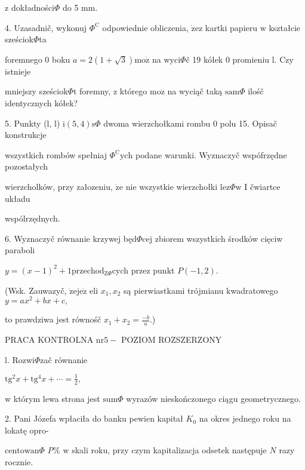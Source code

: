 \documentclass[a4paper,12pt]{article}
\begin{document}
$\mathrm{z}$ dokładności$\Phi$ do 5 mm.

4. Uzasadnič, wykonuj $\Phi^{\mathrm{C}}$ odpowiednie obliczenia, $\dot{\mathrm{z}}\mathrm{e}\mathrm{z}$ kartki papieru $\mathrm{w}$ kształcie sześciok$\Phi$ta

foremnego $0$ boku $a= 2(1+\sqrt{3}) \mathrm{m}\mathrm{o}\dot{\mathrm{z}}$ na wyci$\Phi$č 19 kółek $0$ promieniu l. Czy istnieje

mniejszy sześciok$\Phi$t foremny, $\mathrm{z}$ którego $\mathrm{m}\mathrm{o}\dot{\mathrm{z}}$ na wyciąč taką $\mathrm{s}\mathrm{a}\mathrm{m}\Phi$ ilośč identycznych kółek?

5. Punkty (l, l) $\mathrm{i} (5,4) \mathrm{s}\Phi$ dwoma wierzchołkami rombu $0$ polu 15. Opisač konstrukcje

wszystkich rombów spełniaj $\Phi^{\mathrm{C}}\mathrm{y}\mathrm{c}\mathrm{h}$ podane warunki. Wyznaczyč wspófrzędne pozostałych

wierzcholków, przy załozeniu, $\dot{\mathrm{z}}\mathrm{e}$ nie wszystkie wierzchołki $\mathrm{l}\mathrm{e}\mathrm{z}\Phi \mathrm{w}$ I čwiartce układu

wspólrzędnych.

6. Wyznaczyč równanie krzywej będ$\Phi$cej zbiorem wszystkich środków cięciw paraboli

$y=(x-1)^{2}+1 \mathrm{p}\mathrm{r}\mathrm{z}\mathrm{e}\mathrm{c}\mathrm{h}\mathrm{o}\mathrm{d}_{\mathrm{Z}\Phi}$cych przez punkt $P(-1,2).$

(Wsk. Zauwazyč, $\dot{\mathrm{z}}\mathrm{e}\mathrm{j}\mathrm{e}\dot{\mathrm{z}}$ eli $x_{1}, x_{2}$ są pierwiastkami trójmianu kwadratowego $y=ax^{2}+bx+c,$

to prawdziwa jest równośč $x_{1}+x_{2}=\displaystyle \frac{-b}{a}.$)





PRACA KONTROLNA $\mathrm{n}\mathrm{r} 5-$ POZIOM ROZSZERZONY

l. Rozwi$\Phi$zač równanie

$\displaystyle \mathrm{t}\mathrm{g}^{2}x+\mathrm{t}\mathrm{g}^{4}x+\cdots=\frac{1}{2},$

$\mathrm{w}$ którym lewa strona jest $\mathrm{s}\mathrm{u}\mathrm{m}\Phi$ wyrazów nieskończonego ciągu geometrycznego.

2. Pani Józefa wpłaciła do banku pewien kapitał $K_{0}$ na okres jednego roku na lokatę opro-

$\mathrm{c}\mathrm{e}\mathrm{n}\mathrm{t}\mathrm{o}\mathrm{w}\mathrm{a}\mathrm{n}\Phi$ {\it P}\% $\mathrm{w}$ skali roku, przy czym kapitalizacja odsetek następuje $N$ razy rocznie.
\end{document}
